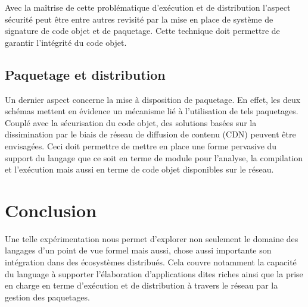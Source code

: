 \documentclass[twoside,a4paper]{article}
\begin{document}
Avec la maîtrise de cette problématique d'exécution et de distribution
l'aspect sécurité peut être entre autres revisité par la mise en place
de  système  de  signature  de  code objet  et  de  paquetage.   Cette
technique doit permettre de garantir l'intégrité du code objet.

\subsection{Paquetage et distribution}

Un  dernier aspect  concerne la  mise à  disposition de  paquetage. En
effet,  les  deux schémas  mettent  en  évidence  un mécanisme  lié  à
l'utilisation de tels paquetages.  Couplé avec la sécurisation du code
objet,  des solutions  basées sur  la  dissimination par  le biais  de
réseau de  diffusion de contenu  (CDN) peuvent être  envisagées.  Ceci
doit permettre  de mettre en place  une forme pervasive du  support du
langage que ce soit en terme  de module pour l'analyse, la compilation
et l'exécution  mais aussi en terme  de code objet disponibles  sur le
réseau.

\section{Conclusion}

Une  telle expérimentation  nous  permet d'explorer  non seulement  le
domaine des langages d'un point de  vue formel mais aussi, chose aussi
importante  son intégration  dans  des  écosystèmes distribués.   Cela
couvre  notamment la  capacité du  language à  supporter l'élaboration
d'applications  dites riches  ainsi que  la prise  en charge  en terme
d'exécution et de distribution à travers  le réseau par la gestion des
paquetages.



\end{document}
